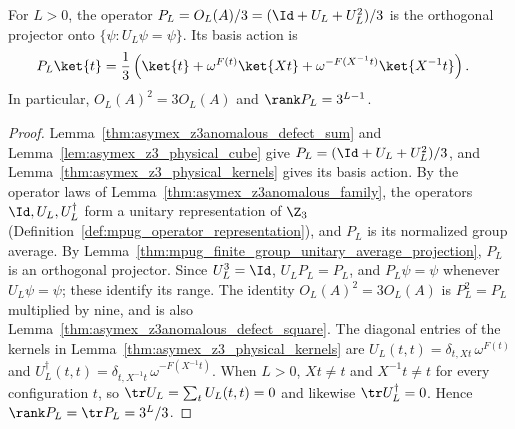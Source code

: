 \begin{lemma}
    \label{lem:asymex_z3_defect_projector}
    \leanok
    For $L>0$, the operator
    $P_L=O_L(A)/3=(\Id+U_L+U_L^2)/3$ is the orthogonal projector onto
    $\{\psi:U_L\psi=\psi\}$. Its basis action is
    \begin{align}
        P_L\ket{t}
         & =\frac{1}{3}\left(\ket{t}+\omega^{F(t)}\ket{Xt}
        +\omega^{-F(X^{-1}t)}\ket{X^{-1}t}\right).
    \end{align}
    In particular, $O_L(A)^2=3O_L(A)$ and $\rank P_L=3^{L-1}$.
\end{lemma}

\begin{proof}
    \leanok
    Lemma~\ref{thm:asymex_z3anomalous_defect_sum} and
    Lemma~\ref{lem:asymex_z3_physical_cube} give
    $P_L=(\Id+U_L+U_L^2)/3$, and
    Lemma~\ref{thm:asymex_z3_physical_kernels} gives its basis action.
    By the operator laws of Lemma~\ref{thm:asymex_z3anomalous_family}, the
    operators $\Id,U_L,U_L^\dagger$ form a unitary representation of $\Z_3$
    (Definition~\ref{def:mpug_operator_representation}), and
    $P_L$ is its normalized group average. By
    Lemma~\ref{thm:mpug_finite_group_unitary_average_projection},
    $P_L$ is an orthogonal projector.
    Since $U_L^3=\Id$, $U_LP_L=P_L$, and
    $P_L\psi=\psi$ whenever $U_L\psi=\psi$; these identify its range.
    The identity $O_L(A)^2=3O_L(A)$ is $P_L^2=P_L$ multiplied by nine,
    and is also Lemma~\ref{thm:asymex_z3anomalous_defect_square}.
    The diagonal entries of the kernels in
    Lemma~\ref{thm:asymex_z3_physical_kernels} are
    $U_L(t,t)=\delta_{t,Xt}\,\omega^{F(t)}$ and
    $U_L^\dagger(t,t)=\delta_{t,X^{-1}t}\,\omega^{-F(X^{-1}t)}$.
    When $L>0$, $Xt\neq t$ and $X^{-1}t\neq t$ for every configuration $t$, so
    $\tr U_L=\sum_tU_L(t,t)=0$ and likewise $\tr U_L^\dagger=0$. Hence
    $\rank P_L=\tr P_L=3^L/3$.
\end{proof}

